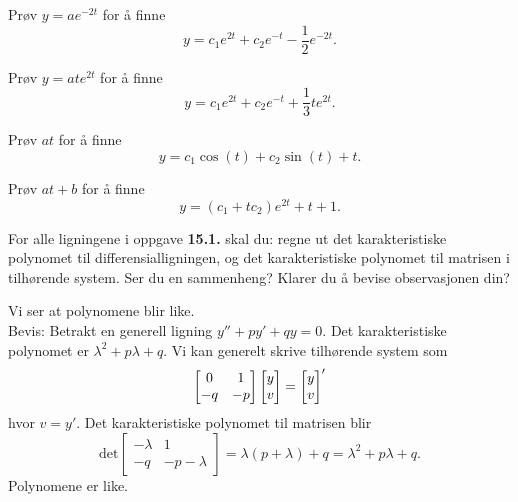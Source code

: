 \begin{losning}
	\begin{punkt} Prøv $y=a e^{-2t}$ for å finne
		$$y=c_1 e^{2t}+c_2 e^{-t}-\frac{1}{2}e^{-2t}.$$
	\end{punkt}

	\begin{punkt} Prøv $y=a t e^{2t}$ for å finne
		$$y=c_1 e^{2t}+c_2 e^{-t}+\frac{1}{3} t e^{2t}.$$
	\end{punkt}
	
	\begin{punkt} Prøv $a t$ for å finne
		$$y=c_1\cos(t)+ c_2 \sin (t)+t.$$
	\end{punkt}
	
	\begin{punkt} Prøv $at+b$ for å finne
		$$y=(c_1+tc_2)e^{2t}+t+1.$$
	\end{punkt}
	
\end{losning}

\begin{oppgave}
For alle ligningene i oppgave \textbf{15.1.} skal du: regne ut det karakteristiske polynomet til differensialligningen, og det karakteristiske polynomet til matrisen i tilhørende system. Ser du en sammenheng? Klarer du å bevise observasjonen din?
\end{oppgave}

\begin{losning}
Vi ser at polynomene blir like.
\\

Bevis: Betrakt en generell ligning $y''+py'+qy=0$. Det karakteristiske polynomet er $\lambda ^2+p\lambda+q$. Vi kan generelt skrive tilhørende system som $$\begin{bmatrix}
0 & 1\\
-q & -p
\end{bmatrix} \begin{bmatrix} y \\ v \end{bmatrix}=\begin{bmatrix} y \\ v \end{bmatrix} '
$$ hvor $v=y'$. Det karakteristiske polynomet til matrisen blir $$
\text{det}\begin{bmatrix}
-\lambda & 1\\
-q & -p-\lambda
\end{bmatrix}=\lambda(p+\lambda)+q=\lambda^2+p\lambda+q.
$$Polynomene er like.
\end{losning}

